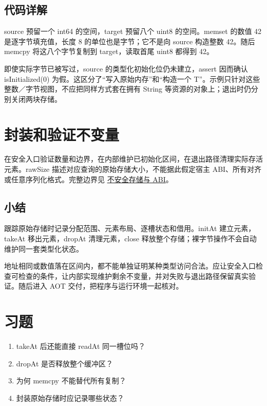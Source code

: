 \subsection*{代码详解}

source 预留一个 int64 的空间，target 预留八个 uint8 的空间。memset 的数值 42 是逐字节填充值，长度 8 的单位也是字节；它不是向 source 构造整数 42。随后 memcpy 将这八个字节复制到 target，读取首尾 uint8 都得到 42。

即使实际字节已被写过，source 的类型化初始化位仍未建立，assert 因而确认 isInitialized(0) 为假。这区分了“写入原始内存”和“构造一个 T”。示例只针对这些整数／字节视图，不应把同样方式套在拥有 String 等资源的对象上；退出时仍分别关闭两块存储。

\section{封装和验证不变量}

在安全入口验证数量和边界，在内部维护已初始化区间，在退出路径清理实际存活元素。rawSize 描述对应查询的原始存储大小，不能据此假定宿主 ABI、所有对齐或任意序列化格式。完整边界见 \href{https://github.com/rabbitc999/ChaLi/blob/master/doc/41-unsafe-abi.md}{不安全存储与 ABI}。

\subsection*{小结}

跟踪原始存储时记录分配范围、元素布局、逐槽状态和借用。initAt 建立元素，takeAt 移出元素，dropAt 清理元素，close 释放整个存储；裸字节操作不会自动维护同一套类型化状态。

地址相同或数值落在区间内，都不能单独证明某种类型访问合法。应让安全入口检查可检查的条件，让内部实现维护剩余不变量，并对失败与退出路径保留真实验证。随后进入 AOT 交付，把程序与运行环境一起核对。

\section{习题}

\begin{enumerate}

\item takeAt 后还能直接 readAt 同一槽位吗？

\item dropAt 是否释放整个缓冲区？

\item 为何 memcpy 不能替代所有复制？

\item 封装原始存储时应记录哪些状态？

\end{enumerate}

